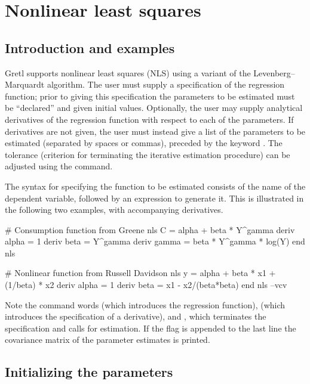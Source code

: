 \chapter{Nonlinear least squares}
\label{chap:nls}

\section{Introduction and examples}
\label{nls-intro}

Gretl supports nonlinear least squares (NLS) using a variant of
the Levenberg--Marquardt algorithm.  The user must supply a
specification of the regression function; prior to giving this
specification the parameters to be estimated must be ``declared'' and
given initial values.  Optionally, the user may supply analytical
derivatives of the regression function with respect to each of the
parameters.  If derivatives are not given, the user must instead give
a list of the parameters to be estimated (separated by spaces or
commas), preceded by the keyword .  The tolerance
(criterion for terminating the iterative estimation procedure) can be
adjusted using the  command.

The syntax for specifying the function to be estimated consists of the
name of the dependent variable, followed by an expression to generate
it. This is illustrated in the following two examples, with
accompanying derivatives.

\begin{code}
# Consumption function from Greene
nls C = alpha + beta * Y^gamma
    deriv alpha = 1
    deriv beta = Y^gamma
    deriv gamma = beta * Y^gamma * log(Y)
end nls

# Nonlinear function from Russell Davidson
nls y = alpha + beta * x1 + (1/beta) * x2
    deriv alpha = 1
    deriv beta = x1 - x2/(beta*beta)
end nls --vcv
\end{code}

Note the command words  (which introduces the regression
function),  (which introduces the specification of a
derivative), and , which terminates the specification and
calls for estimation. If the  flag is appended to the last
line the covariance matrix of the parameter estimates is printed.

\section{Initializing the parameters}
\label{nls-param}

